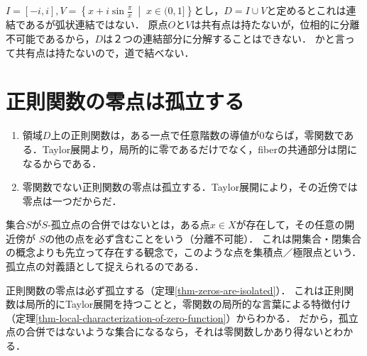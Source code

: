 \documentclass[uplatex, dvipdfmx]{jsreport}
\begin{document}
\begin{example}[連結であって弧状連結でない例]
    $I=[-i,i],V=\left\{x+i\sin\frac{\pi}{x}\;\middle|\;x\in(0,1]\right\}$とし，$D=I\cup V$と定めるとこれは連結であるが弧状連結ではない．
    原点$O$と$V$は共有点は持たないが，位相的に分離不可能であるから，$D$は２つの連結部分に分解することはできない．
    かと言って共有点は持たないので，道で結べない．
\end{example}

\section{正則関数の零点は孤立する}

\begin{tcolorbox}[colframe=ForestGreen, colback=ForestGreen!10!white, breakable ,colbacktitle=ForestGreen!40!white, coltitle=black,fonttitle=\bfseries\sffamily,
    title=複素関数の解析性から流出する性質]
    \begin{enumerate}
        \item 領域$D$上の正則関数は，ある一点で任意階数の導値が$0$ならば，零関数である．Taylor展開より，局所的に零であるだけでなく，fiberの共通部分は閉になるからである．
        \item 零関数でない正則関数の零点は孤立する．Taylor展開により，その近傍では零点は一つだからだ．
    \end{enumerate}
    集合$S$が$S$-孤立点の合併ではないとは，ある点$x\in X$が存在して，その任意の開近傍が
    $S$の他の点を必ず含むことをいう（分離不可能）．
    これは開集合・閉集合の概念よりも先立って存在する観念で，このような点を集積点／極限点という．
    孤立点の対義語として捉えられるのである．

    正則関数の零点は必ず孤立する（定理\ref{thm-zeros-are-isolated}）．
    これは正則関数は局所的にTaylor展開を持つことと，零関数の局所的な言葉による特徴付け（定理\ref{thm-local-characterization-of-zero-function}）からわかる．
    だから，孤立点の合併ではないような集合になるなら，それは零関数しかあり得ないとわかる．
\end{tcolorbox}
\end{document}
